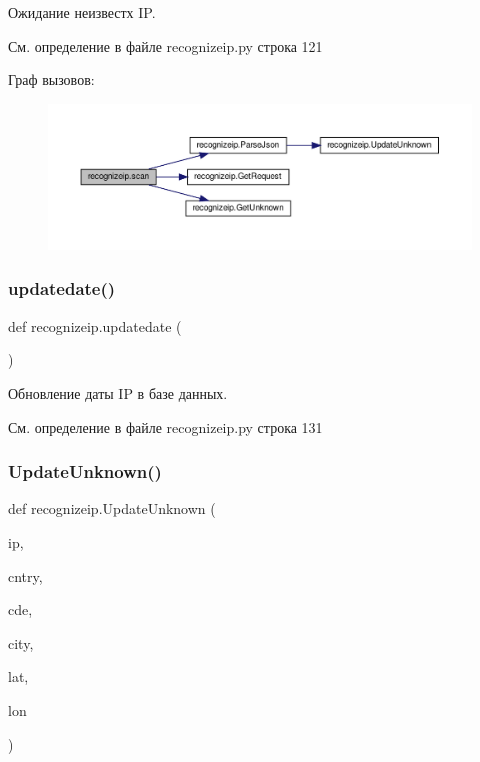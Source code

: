 Ожидание неизвестх IP. 



См. определение в файле recognizeip.\+py строка 121

Граф вызовов\+:\nopagebreak
\begin{figure}[H]
\begin{center}
\leavevmode
\includegraphics[width=350pt]{namespacerecognizeip_a9fb9f625acd36513818c1ac2f236070d_cgraph}
\end{center}
\end{figure}
\mbox{\label{namespacerecognizeip_af2c16760c67e840d48d82917a9c9cacb}} 
\subsubsection{\texorpdfstring{updatedate()}{updatedate()}}
{\footnotesize\ttfamily def recognizeip.\+updatedate (\begin{DoxyParamCaption}{ }\end{DoxyParamCaption})}



Обновление даты IP в базе данных. 



См. определение в файле recognizeip.\+py строка 131

\mbox{\label{namespacerecognizeip_a7055bdccbd846aa71a7be77513548e08}} 
\subsubsection{\texorpdfstring{Update\+Unknown()}{UpdateUnknown()}}
{\footnotesize\ttfamily def recognizeip.\+Update\+Unknown (\begin{DoxyParamCaption}\item[{}]{ip,  }\item[{}]{cntry,  }\item[{}]{cde,  }\item[{}]{city,  }\item[{}]{lat,  }\item[{}]{lon }\end{DoxyParamCaption})}



